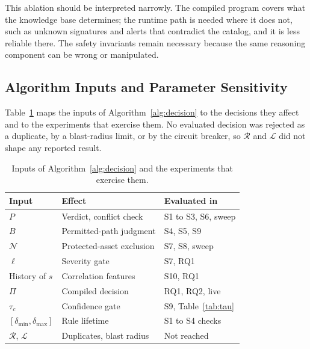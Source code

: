 \documentclass[final,5p]{elsarticle}
\begin{document}
This ablation should be interpreted narrowly. The compiled program covers what the knowledge base determines; the runtime path is needed where it does not, such as unknown signatures and alerts that contradict the catalog, and it is less reliable there. The safety invariants remain necessary because the same reasoning component can be wrong or manipulated.

\subsection{Algorithm Inputs and Parameter Sensitivity}
\label{sec:sensitivity}

Table~\ref{tab:inputs_map} maps the inputs of Algorithm~\ref{alg:decision} to the decisions they affect and to the experiments that exercise them. No evaluated decision was rejected as a duplicate, by a blast-radius limit, or by the circuit breaker, so $\mathcal{R}$ and $\mathcal{L}$ did not shape any reported result.

\begin{table}[t]
    \centering
    \caption{Inputs of Algorithm~\ref{alg:decision} and the experiments that exercise them.}
    \label{tab:inputs_map}
    \small
    \setlength{\tabcolsep}{3pt}
    \begin{tabular}{@{}lll@{}}
        \toprule
        \textbf{Input} & \textbf{Effect} & \textbf{Evaluated in} \\
        \midrule
        $P$ & Verdict, conflict check & S1 to S3, S6, sweep \\
        $B$ & Permitted-path judgment & S4, S5, S9 \\
        $\mathcal{N}$ & Protected-asset exclusion & S7, S8, sweep \\
        $\ell$ & Severity gate & S7, RQ1 \\
        History of $s$ & Correlation features & S10, RQ1 \\
        $\Pi$ & Compiled decision & RQ1, RQ2, live \\
        $\tau_c$ & Confidence gate & S9, Table~\ref{tab:tau} \\
        $[\delta_{\min},\delta_{\max}]$ & Rule lifetime & S1 to S4 checks \\
        $\mathcal{R}$, $\mathcal{L}$ & Duplicates, blast radius & Not reached \\
        \bottomrule
    \end{tabular}
\end{table}
\end{document}
